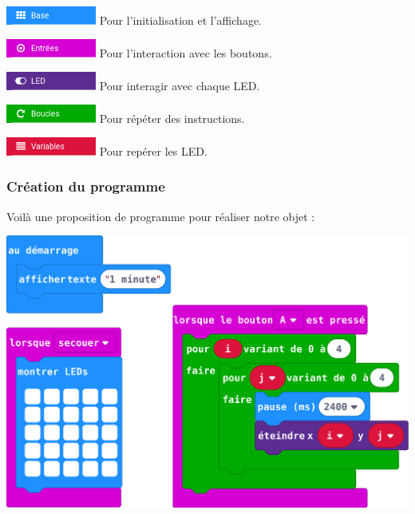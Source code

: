 \begin{description}
  \item \includegraphics[width=8em]{res/blocsMkCd/MB_makecode_cat-base.png} Pour l'initialisation et l'affichage.
  \item \includegraphics[width=8em]{res/blocsMkCd/MB_makecode_cat-entrees.png} Pour l'interaction avec les boutons.
  \item \includegraphics[width=8em]{res/blocsMkCd/MB_makecode_cat-LED.png} Pour interagir avec chaque LED.
  \item \includegraphics[width=8em]{res/blocsMkCd/MB_makecode_cat-boucles.png} Pour répéter des instructions.
  \item \includegraphics[width=8em]{res/blocsMkCd/MB_makecode_cat-variables.png} Pour repérer les LED.
\end{description}



\subsubsection{Création du programme}


Voilà une proposition de programme pour réaliser notre objet :
\begin{center}
  \includegraphics[width=0.6\linewidth]{res/mb-makecode_1erProg_eleve.png}
\end{center}

